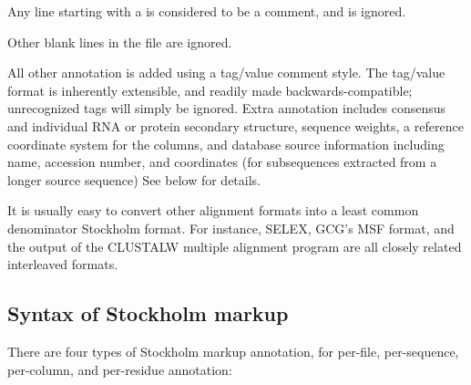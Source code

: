 Any line starting with a \ccode{\#} is considered to be a comment, and
is ignored.

Other blank lines in the file are ignored. 

All other annotation is added using a tag/value comment style. The
tag/value format is inherently extensible, and readily made
backwards-compatible; unrecognized tags will simply be ignored. Extra
annotation includes consensus and individual RNA or protein secondary
structure, sequence weights, a reference coordinate system for the
columns, and database source information including name, accession
number, and coordinates (for subsequences extracted from a longer
source sequence) See below for details.

It is usually easy to convert other alignment formats into a least
common denominator Stockholm format. For instance, SELEX, GCG's MSF
format, and the output of the CLUSTALW multiple alignment program are
all closely related interleaved formats.



\subsection{Syntax of Stockholm markup}

There are four types of Stockholm markup annotation, for per-file,
per-sequence, per-column, and per-residue annotation:

